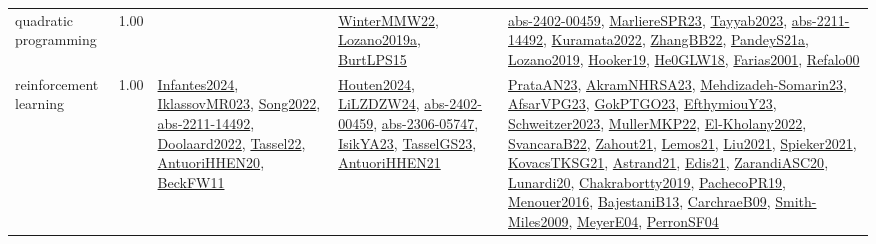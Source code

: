 {\begin{longtable}{p{3cm}r>{\raggedright\arraybackslash}p{6cm}>{\raggedright\arraybackslash}p{6cm}>{\raggedright\arraybackslash}p{8cm}}
\index{quadratic programming}\index{Algorithms!quadratic programming}quadratic programming &  1.00 &  & \hyperref[detail:WinterMMW22]{WinterMMW22}, \hyperref[detail:Lozano2019a]{Lozano2019a}, \hyperref[detail:BurtLPS15]{BurtLPS15} & \hyperref[detail:abs-2402-00459]{abs-2402-00459}, \hyperref[detail:MarliereSPR23]{MarliereSPR23}, \hyperref[detail:Tayyab2023]{Tayyab2023}, \hyperref[detail:abs-2211-14492]{abs-2211-14492}, \hyperref[detail:Kuramata2022]{Kuramata2022}, \hyperref[detail:ZhangBB22]{ZhangBB22}, \hyperref[detail:PandeyS21a]{PandeyS21a}, \hyperref[detail:Lozano2019]{Lozano2019}, \hyperref[detail:Hooker19]{Hooker19}, \hyperref[detail:He0GLW18]{He0GLW18}, \hyperref[detail:Farias2001]{Farias2001}, \hyperref[detail:Refalo00]{Refalo00}\\
\index{reinforcement learning}\index{Algorithms!reinforcement learning}reinforcement learning &  1.00 & \hyperref[detail:Infantes2024]{Infantes2024}, \hyperref[detail:IklassovMR023]{IklassovMR023}, \hyperref[detail:Song2022]{Song2022}, \hyperref[detail:abs-2211-14492]{abs-2211-14492}, \hyperref[detail:Doolaard2022]{Doolaard2022}, \hyperref[detail:Tassel22]{Tassel22}, \hyperref[detail:AntuoriHHEN20]{AntuoriHHEN20}, \hyperref[detail:BeckFW11]{BeckFW11} & \hyperref[detail:Houten2024]{Houten2024}, \hyperref[detail:LiLZDZW24]{LiLZDZW24}, \hyperref[detail:abs-2402-00459]{abs-2402-00459}, \hyperref[detail:abs-2306-05747]{abs-2306-05747}, \hyperref[detail:IsikYA23]{IsikYA23}, \hyperref[detail:TasselGS23]{TasselGS23}, \hyperref[detail:AntuoriHHEN21]{AntuoriHHEN21} & \hyperref[detail:PrataAN23]{PrataAN23}, \hyperref[detail:AkramNHRSA23]{AkramNHRSA23}, \hyperref[detail:Mehdizadeh-Somarin23]{Mehdizadeh-Somarin23}, \hyperref[detail:AfsarVPG23]{AfsarVPG23}, \hyperref[detail:GokPTGO23]{GokPTGO23}, \hyperref[detail:EfthymiouY23]{EfthymiouY23}, \hyperref[detail:Schweitzer2023]{Schweitzer2023}, \hyperref[detail:MullerMKP22]{MullerMKP22}, \hyperref[detail:El-Kholany2022]{El-Kholany2022}, \hyperref[detail:SvancaraB22]{SvancaraB22}, \hyperref[detail:Zahout21]{Zahout21}, \hyperref[detail:Lemos21]{Lemos21}, \hyperref[detail:Liu2021]{Liu2021}, \hyperref[detail:Spieker2021]{Spieker2021}, \hyperref[detail:KovacsTKSG21]{KovacsTKSG21}, \hyperref[detail:Astrand21]{Astrand21}, \hyperref[detail:Edis21]{Edis21}, \hyperref[detail:ZarandiASC20]{ZarandiASC20}, \hyperref[detail:Lunardi20]{Lunardi20}, \hyperref[detail:Chakrabortty2019]{Chakrabortty2019}, \hyperref[detail:PachecoPR19]{PachecoPR19}, \hyperref[detail:Menouer2016]{Menouer2016}, \hyperref[detail:BajestaniB13]{BajestaniB13}, \hyperref[detail:CarchraeB09]{CarchraeB09}, \hyperref[detail:Smith-Miles2009]{Smith-Miles2009}, \hyperref[detail:MeyerE04]{MeyerE04}, \hyperref[detail:PerronSF04]{PerronSF04}\\

\end{longtable}}
